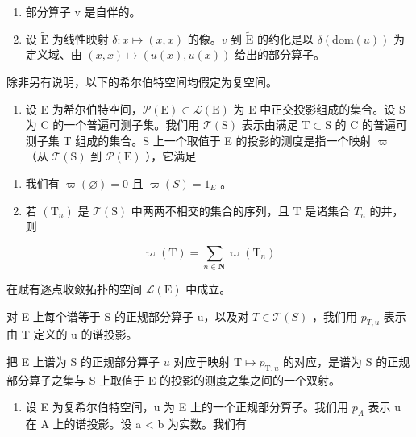 \begin{enumerate}
\def\labelenumi{\alph{enumi})}
\item
  部分算子 v 是自伴的。
\item
  设 \(\widetilde{\mathrm{E}}\) 为线性映射 \(\delta\colon x\mapsto(x,x)\) 的像。\(v\) 到 \(\widetilde{\mathrm{E}}\) 的约化是以 \(\delta(\mathrm{dom}(u))\) 为定义域、由 \((x,x)\mapsto(u(x),u(x))\) 给出的部分算子。
\end{enumerate}

\exercisesection{}

除非另有说明，以下的希尔伯特空间均假定为复空间。

\begin{enumerate}
\def\labelenumi{\arabic{enumi})}
\tightlist
\item
  设 E 为希尔伯特空间，\(\mathcal{P}(\mathrm{E})\subset \mathcal{L}(\mathrm{E})\) 为 E 中正交投影组成的集合。设 S 为 C 的一个普遍可测子集。我们用 \(\mathcal{T}(\mathrm{S})\) 表示由满足 \(\mathrm{T}\subset \mathrm{S}\) 的 C 的普遍可测子集 T 组成的集合。S 上一个取值于 E 的投影的测度是指一个映射 \(\varpi\) （从 \(\mathcal{T}(\mathrm{S})\) 到 \(\mathcal{P}(\mathrm{E})\) ），它满足
\end{enumerate}

\begin{enumerate}
\def\labelenumi{(\roman{enumi})}
\item
  我们有 \(\varpi(\varnothing)=0\) 且 \(\varpi(S)=1_{E}\) 。
\item
  若 \((\mathrm{T}_{n})\) 是 \(\mathcal{T}(\mathrm{S})\) 中两两不相交的集合的序列，且 T 是诸集合 \(T_{n}\) 的并，则
\end{enumerate}

\[
\varpi (\mathrm{T}) = \sum_ {n \in \mathbf {N}} \varpi (\mathrm{T} _ {n})
\]

在赋有逐点收敛拓扑的空间 \(\mathcal{L}(\mathrm{E})\) 中成立。

对 E 上每个谱等于 S 的正规部分算子 u，以及对 \(T \in \mathcal{T}(S)\) ，我们用 \(p_{T,u}\) 表示由 T 定义的 u 的谱投影。

把 E 上谱为 S 的正规部分算子 \(u\) 对应于映射 \(\mathrm{T} \mapsto p_{\mathrm{T}, u}\) 的对应，是谱为 S 的正规部分算子之集与 S 上取值于 E 的投影的测度之集之间的一个双射。

\begin{enumerate}
\def\labelenumi{\arabic{enumi})}
\setcounter{enumi}{1}
\tightlist
\item
  设 E 为复希尔伯特空间，u 为 E 上的一个正规部分算子。我们用 \(p_{A}\) 表示 u 在 A 上的谱投影。设 a \textless{} b 为实数。我们有
\end{enumerate}

